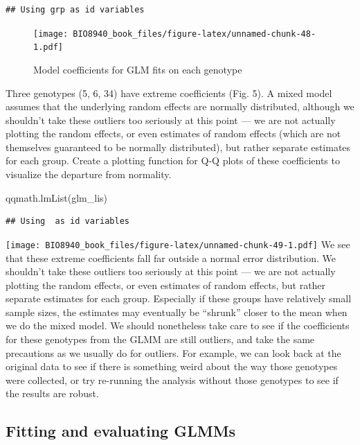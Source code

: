\documentclass[
  12pt,
]{book}
\newenvironment{Shaded}{\begin{snugshade}}{\end{snugshade}}
\newcommand{\FunctionTok}[1]{\textcolor[rgb]{0.00,0.00,0.00}{#1}}
\newcommand{\NormalTok}[1]{#1}
\begin{document}
\begin{verbatim}
## Using grp as id variables
\end{verbatim}

\begin{figure}
\centering
\texttt{[image: BIO8940\_book\_files/figure-latex/unnamed-chunk-48-1.pdf]}
\caption{\label{fig:unnamed-chunk-48}Model coefficients for GLM fits on each genotype}
\end{figure}

Three genotypes (5, 6, 34) have extreme coefficients (Fig. 5). A mixed model assumes that the underlying random effects are normally distributed, although we shouldn't take these outliers too seriously at this point --- we are not actually plotting the random effects, or even estimates of random effects (which are not themselves guaranteed to be normally distributed), but rather separate estimates for each group.
Create a plotting function for Q-Q plots of these coefficients to visualize the departure from normality.

\begin{Shaded}
\begin{Highlighting}[]
\FunctionTok{qqmath.lmList}\NormalTok{(glm\_lis)}
\end{Highlighting}
\end{Shaded}

\begin{verbatim}
## Using  as id variables
\end{verbatim}

\texttt{[image: BIO8940\_book\_files/figure-latex/unnamed-chunk-49-1.pdf]}
We see that these extreme coefficients fall far outside a normal error distribution. We shouldn't take these outliers too seriously at this point --- we are not actually plotting the random effects, or even estimates of random effects, but rather separate estimates for each group.
Especially if these groups have relatively small sample sizes, the estimates may eventually be ``shrunk'' closer to the mean when we do the mixed model.
We should nonetheless take care to see if the coefficients for these genotypes from the GLMM are still outliers, and take the same precautions as we usually do for outliers. For example, we can look back at the original data to see if there is something weird about the way those genotypes were collected, or try re-running the analysis without those genotypes to see if the results are robust.

\hypertarget{fitting-and-evaluating-glmms}{%
\subsection{Fitting and evaluating GLMMs}\label{fitting-and-evaluating-glmms}}
\end{document}
